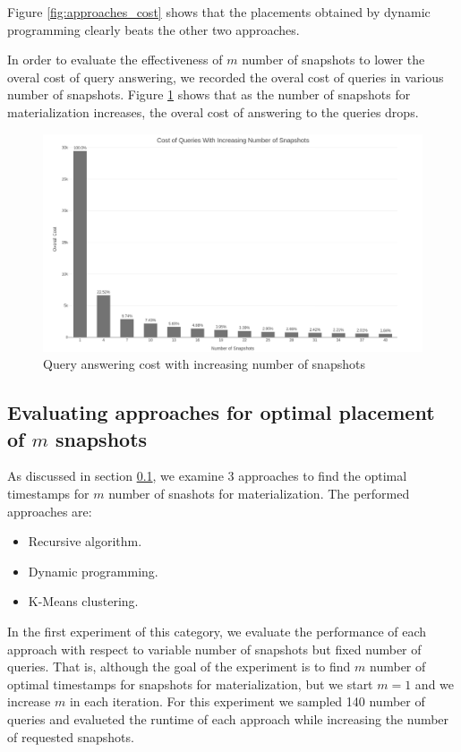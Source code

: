 			Figure \ref{fig:approaches_cost} shows that the placements obtained by dynamic programming clearly beats the other two approaches.

			In order to evaluate the effectiveness of $m$ number of snapshots to lower the overal cost of query answering, we recorded the overal cost of queries in various number of snapshots. Figure \ref{fig:snapshots_cost} shows that as the number of snapshots for materialization increases, the overal cost of answering to the queries drops.

			\begin{figure}
				\centering
				\includegraphics[width=\textwidth]{figs/various_snapshot.jpg}
				\caption{Query answering cost with increasing number of snapshots}
				\label{fig:snapshots_cost}
			\end{figure} 

		\subsection{Evaluating approaches for optimal placement of $m$ snapshots}
			As discussed in section \ref{}, we examine 3 approaches to find the optimal timestamps for $m$ number of snashots for materialization. The performed approaches are:
			\begin{itemize}
				\item Recursive algorithm.
				\item Dynamic programming.
				\item K-Means clustering.
			\end{itemize}

			In the first experiment of this category, we evaluate the performance of each approach with respect to variable number of snapshots but fixed number of queries. That is, although the goal of the experiment is to find $m$ number of optimal timestamps for snapshots for materialization, but we start $m=1$ and we increase $m$ in each iteration. For this experiment we sampled 140 number of queries and evalueted the runtime of each approach while increasing the number of requested snapshots.

